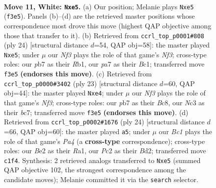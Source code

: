 \documentclass[11pt]{article}
\begin{document}
\clearpage

\begin{figure}[p]\centering
\begin{subfigure}{0.46\textwidth}\centering
\resizebox{\linewidth}{!}{%
\newchessgame
\chessboard[
  setfen={rnbr2k1/pp3pb1/2p2np1/4p2p/4P3/2N2N2/PPP1BPPP/R1B1RK2 w - - 0 11},
  showmover=false,
  pgfstyle=straightmove, color=movearrow, markmove={f3-e5}
]}
\caption{}
\end{subfigure}\hfill
\begin{subfigure}{0.46\textwidth}\centering
\resizebox{\linewidth}{!}{%
\newchessgame
\chessboard[
  setfen={r1br2k1/ppp2pbp/5np1/n3p3/2P5/PPN2NP1/4PPBP/1RB2RK1 w - - 0 13},
  showmover=false,
  pgfstyle=straightmove, color=movearrow, markmove={f3-e5}
]}
\caption{}
\end{subfigure}
\\[4pt]
\begin{subfigure}{0.46\textwidth}\centering
\resizebox{\linewidth}{!}{%
\newchessgame
\chessboard[
  setfen={r1b2rk1/2B1ppbp/p1n2np1/8/Np1PP3/5N2/PP2BPPP/R3K2R b KQ - 1 12},
  showmover=false,
  pgfstyle=straightmove, color=movearrow, markmove={f6-e4}
]}
\caption{}
\end{subfigure}\hfill
\begin{subfigure}{0.46\textwidth}\centering
\resizebox{\linewidth}{!}{%
\newchessgame
\chessboard[
  setfen={r1b4r/1p2kppp/p1n1pn2/2b5/P1B5/2N1PN2/1P1B1PPP/R2R2K1 w - - 2 13},
  showmover=false,
  pgfstyle=straightmove, color=movearrow, markmove={a4-a5}
]}
\caption{}
\end{subfigure}
\caption{\textbf{Move 11, White: \texttt{Nxe5}.} (a) Our position; Melanie plays \texttt{Nxe5} (\texttt{f3e5}). Panels (b)--(d) are the retrieved master positions whose correspondence most drove this move (highest QAP objective among those that transfer to it). (b) Retrieved from \texttt{ccrl\_top\_p0001\#808} (ply 24) [structural distance $d$=54, QAP obj=58]: the master played \texttt{Nxe5}; under $\mu$ our \emph{Nf3} plays the role of that game's \emph{Nf3}; cross-type roles: our \emph{p}b7 as their \emph{R}b1, our \emph{p}a7 as their \emph{B}c1; transferred move \texttt{f3e5} \textbf{(endorses this move)}. (c) Retrieved from \texttt{ccrl\_top\_p0000\#3402} (ply 23) [structural distance $d$=60, QAP obj=44]: the master played \texttt{Nxe4}; under $\mu$ our \emph{Nf3} plays the role of that game's \emph{Nf3}; cross-type roles: our \emph{p}b7 as their \emph{B}c8, our \emph{N}c3 as their \emph{b}c7; transferred move \texttt{f3e5} \textbf{(endorses this move)}. (d) Retrieved from \texttt{ccrl\_top\_p0002\#1676} (ply 24) [structural distance $d$=66, QAP obj=60]: the master played \texttt{a5}; under $\mu$ our \emph{Bc1} plays the role of that game's \emph{Pa4} (a \textbf{cross-type} correspondence); cross-type roles: our \emph{B}e2 as their \emph{R}a1, our \emph{P}c2 as their \emph{B}d2; transferred move \texttt{c1f4}. Synthesis: 2 retrieved analogs transferred to \texttt{Nxe5} (summed QAP objective 102, the strongest correspondence among the candidate moves); Melanie committed it via the \texttt{search} selector.}
\label{fig:thought-m20}
\end{figure}
\end{document}
